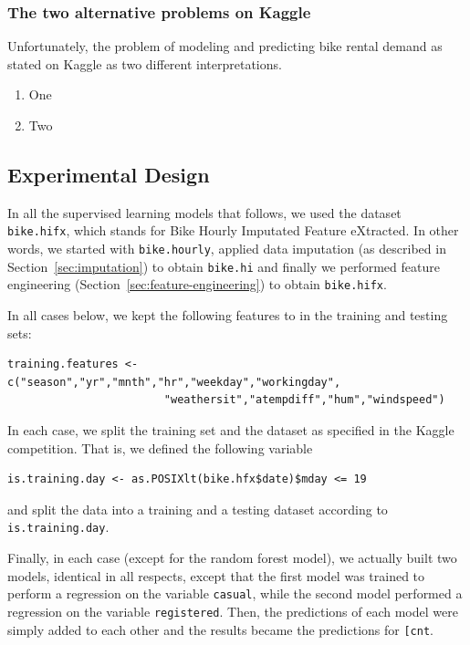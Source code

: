 \documentclass[12pt]{article}
\begin{document}
\subsubsection{The two alternative problems on Kaggle}

Unfortunately, the problem of modeling and predicting bike rental demand as stated on Kaggle as two different interpretations.

\begin{enumerate}
	\item One
	\item Two
\end{enumerate}

\subsection{Experimental Design}

In all the supervised learning models that follows, we used the dataset \texttt{bike.hifx}, which stands for Bike Hourly Imputated Feature eXtracted. In other words, we started with \texttt{bike.hourly}, applied data imputation (as described in Section~\ref{sec:imputation}) to obtain \texttt{bike.hi} and finally we performed feature engineering (Section~\ref{sec:feature-engineering}) to obtain \texttt{bike.hifx}.

In all cases below, we kept the following features to in the training and testing sets:
{\color{blue}
\begin{verbatim}
training.features <-  c("season","yr","mnth","hr","weekday","workingday",
						"weathersit","atempdiff","hum","windspeed")
\end{verbatim}}

In each case, we split the training set and the dataset as specified in the Kaggle competition. That is, we defined the following variable
{\color{blue}
\begin{verbatim}
is.training.day <- as.POSIXlt(bike.hfx$date)$mday <= 19
\end{verbatim}}
and split the data into a training and a testing dataset according to \texttt{is.training.day}.

Finally, in each case (except for the random forest model), we actually built two models, identical in all respects, except that the first model was trained to perform a regression on the variable \texttt{casual}, while the second model performed a regression on the variable \texttt{registered}. Then, the predictions of each model were simply added to each other and the results became the predictions for \texttt{[cnt}.
\end{document}
